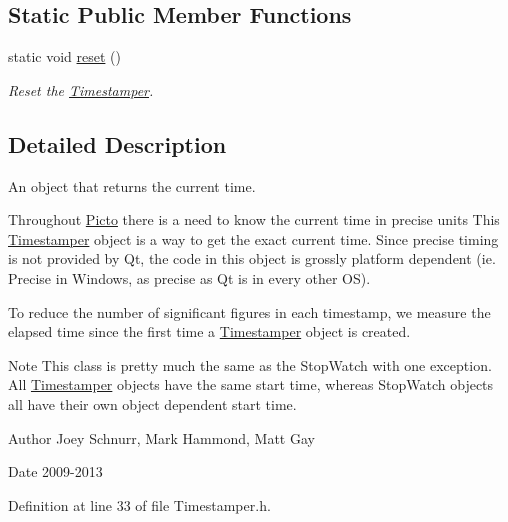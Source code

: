 \subsection*{Static Public Member Functions}
\begin{DoxyCompactItemize}
\item 
static void \hyperlink{class_picto_1_1_timestamper_a46b6525e263f880e17aa8efda9a9a575}{reset} ()
\begin{DoxyCompactList}\small\item\em Reset the \hyperlink{class_picto_1_1_timestamper}{Timestamper}. \end{DoxyCompactList}\end{DoxyCompactItemize}


\subsection{Detailed Description}
An object that returns the current time. 

Throughout \hyperlink{namespace_picto}{Picto} there is a need to know the current time in precise units This \hyperlink{class_picto_1_1_timestamper}{Timestamper} object is a way to get the exact current time. Since precise timing is not provided by Qt, the code in this object is grossly platform dependent (ie. Precise in Windows, as precise as Qt is in every other O\-S).

To reduce the number of significant figures in each timestamp, we measure the elapsed time since the first time a \hyperlink{class_picto_1_1_timestamper}{Timestamper} object is created.

\begin{DoxyNote}{Note}
This class is pretty much the same as the Stop\-Watch with one exception. All \hyperlink{class_picto_1_1_timestamper}{Timestamper} objects have the same start time, whereas Stop\-Watch objects all have their own object dependent start time.
\end{DoxyNote}
\begin{DoxyAuthor}{Author}
Joey Schnurr, Mark Hammond, Matt Gay 
\end{DoxyAuthor}
\begin{DoxyDate}{Date}
2009-\/2013 
\end{DoxyDate}


Definition at line 33 of file Timestamper.\-h.



